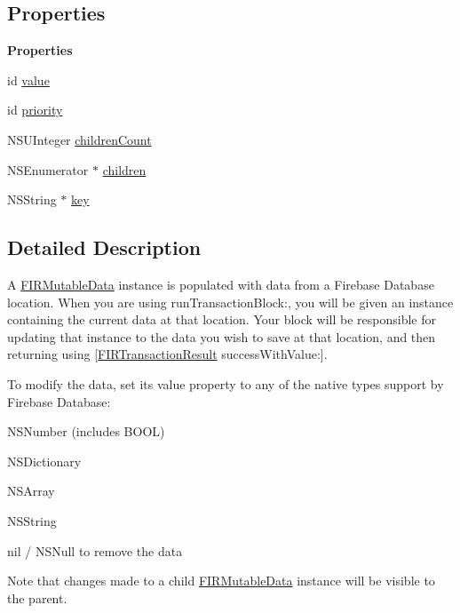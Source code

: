 \subsection*{Properties}
\begin{Indent}{\bf Properties}\par
\begin{DoxyCompactItemize}
\item 
id \hyperlink{interface_f_i_r_mutable_data_ac3228205e697a0b5b8810311d9d3eb94}{value}
\item 
id \hyperlink{interface_f_i_r_mutable_data_a3dd9f79c360f2ffd294554921134859f}{priority}
\item 
N\+S\+U\+Integer \hyperlink{interface_f_i_r_mutable_data_a1368b73f3a5f175f574b50e4db8052cd}{children\+Count}
\item 
N\+S\+Enumerator $\ast$ \hyperlink{interface_f_i_r_mutable_data_a19e8940d4b7fa6837de4907c4d5504c0}{children}
\item 
N\+S\+String $\ast$ \hyperlink{interface_f_i_r_mutable_data_aeb2a1a78746a4d916734cb2c3d62f673}{key}
\end{DoxyCompactItemize}
\end{Indent}


\subsection{Detailed Description}
A \hyperlink{interface_f_i_r_mutable_data}{F\+I\+R\+Mutable\+Data} instance is populated with data from a Firebase Database location. When you are using run\+Transaction\+Block\+:, you will be given an instance containing the current data at that location. Your block will be responsible for updating that instance to the data you wish to save at that location, and then returning using \mbox{[}\hyperlink{interface_f_i_r_transaction_result}{F\+I\+R\+Transaction\+Result} success\+With\+Value\+:\mbox{]}.

To modify the data, set its value property to any of the native types support by Firebase Database\+:
\begin{DoxyItemize}
\item N\+S\+Number (includes B\+O\+O\+L)
\item N\+S\+Dictionary
\item N\+S\+Array
\item N\+S\+String
\item nil / N\+S\+Null to remove the data
\end{DoxyItemize}

Note that changes made to a child \hyperlink{interface_f_i_r_mutable_data}{F\+I\+R\+Mutable\+Data} instance will be visible to the parent. 

